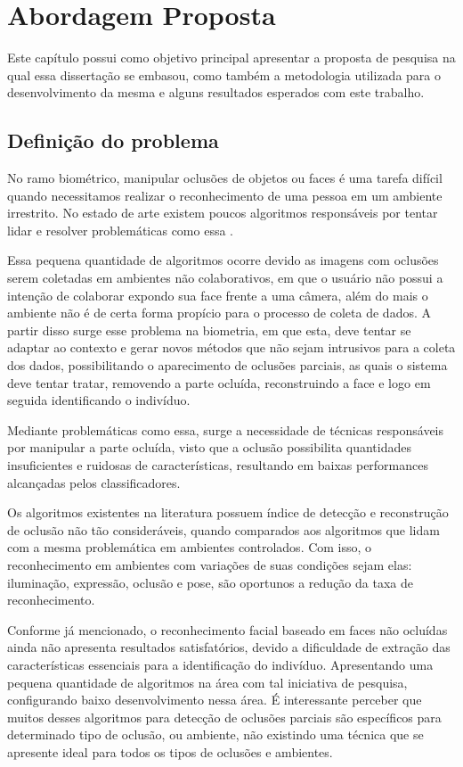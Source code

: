 \chapter{Abordagem Proposta}
\label{cp:7_proposta}

Este capítulo possui como objetivo principal apresentar a proposta de pesquisa na qual essa dissertação se embasou, como também a metodologia utilizada para o desenvolvimento da mesma e alguns resultados esperados com este trabalho.

\section{Definição do problema}
\label{def. Problema}

No ramo biométrico, manipular oclusões de objetos ou faces é uma tarefa difícil quando necessitamos realizar o reconhecimento de uma pessoa em um ambiente irrestrito. No estado de arte existem poucos algoritmos responsáveis por tentar lidar e resolver problemáticas como essa \cite{Targino2018_wvc}. 


Essa pequena quantidade de algoritmos ocorre devido as imagens com oclusões serem coletadas em ambientes não colaborativos, em que o usuário não possui a intenção de colaborar expondo sua face frente a uma câmera, além do mais o ambiente não é de certa forma propício para o processo de coleta de dados. A partir disso surge esse problema na biometria, em que esta, deve tentar se adaptar ao contexto e gerar novos métodos que não sejam intrusivos para a coleta dos dados, possibilitando o aparecimento de oclusões parciais, as quais o sistema deve tentar tratar, removendo a parte ocluída, reconstruindo a face e logo em seguida identificando o indivíduo.

Mediante problemáticas como essa, surge a necessidade de técnicas responsáveis por manipular a parte ocluída, visto que a oclusão possibilita quantidades insuficientes e ruidosas de características, resultando em baixas performances alcançadas pelos classificadores. 

Os algoritmos existentes na literatura possuem índice de detecção e reconstrução de oclusão não tão consideráveis, quando comparados aos algoritmos que lidam com a mesma problemática em ambientes controlados. Com isso, o reconhecimento em ambientes com variações de suas condições sejam elas: iluminação, expressão, oclusão e pose, são oportunos a redução da taxa de reconhecimento.

Conforme já mencionado, o reconhecimento facial baseado em faces não ocluídas ainda não apresenta resultados satisfatórios, devido a dificuldade de extração das características essenciais para a identificação do indivíduo. Apresentando uma pequena quantidade de algoritmos na área com tal iniciativa de pesquisa, configurando baixo desenvolvimento nessa área. É interessante perceber que muitos desses algoritmos para detecção de oclusões parciais são específicos para determinado tipo de oclusão, ou ambiente, não existindo uma técnica que se apresente ideal para todos os tipos de oclusões e ambientes.


